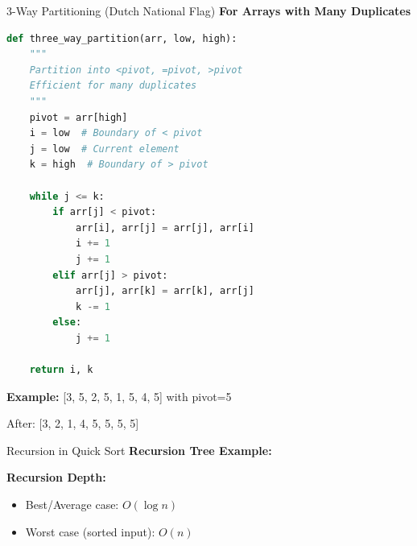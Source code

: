 \documentclass[aspectratio=169]{beamer}
\begin{document}
\begin{frame}[fragile]{3-Way Partitioning (Dutch National Flag)}
  \textbf{For Arrays with Many Duplicates}

\begin{lstlisting}[language=Python, basicstyle=\ttfamily\tiny]
def three_way_partition(arr, low, high):
    """
    Partition into <pivot, =pivot, >pivot
    Efficient for many duplicates
    """
    pivot = arr[high]
    i = low  # Boundary of < pivot
    j = low  # Current element
    k = high  # Boundary of > pivot

    while j <= k:
        if arr[j] < pivot:
            arr[i], arr[j] = arr[j], arr[i]
            i += 1
            j += 1
        elif arr[j] > pivot:
            arr[j], arr[k] = arr[k], arr[j]
            k -= 1
        else:
            j += 1

    return i, k
\end{lstlisting}

\textbf{Example:} [3, 5, 2, 5, 1, 5, 4, 5] with pivot=5

After: [3, 2, 1, 4, 5, 5, 5, 5]
\end{frame}

\begin{frame}{Recursion in Quick Sort}
  \textbf{Recursion Tree Example:}

  \begin{center}
  \end{center}

  \vspace{0.3cm}
  \textbf{Recursion Depth:}
  \begin{itemize}
    \item Best/Average case: $O(\log n)$
    \item Worst case (sorted input): $O(n)$
  \end{itemize}
\end{frame}
\end{document}
